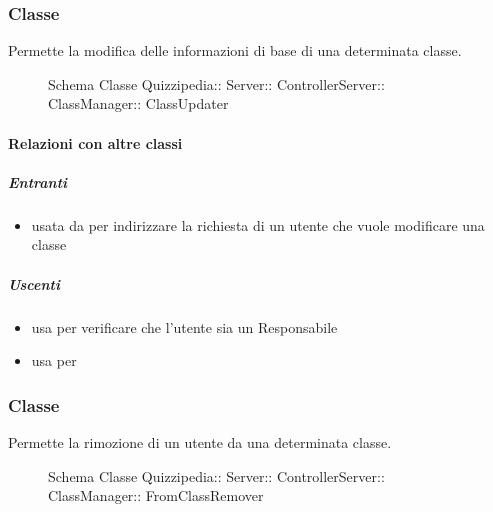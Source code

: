 \subsubsection{Classe }
Permette la modifica delle informazioni di base di una determinata classe.
\begin{figure}[H]
\centering
\noindent{}
\caption[Schema Classe ClassUpdater]{Schema Classe Quizzipedia:: Server:: ControllerServer:: ClassManager:: ClassUpdater}
\end{figure}
\paragraph{Relazioni con altre classi}
\subparagraph{Entranti}
\begin{itemize}
\item usata da  per indirizzare la richiesta di un utente che vuole modificare una classe
\end{itemize}
\subparagraph{Uscenti}
\begin{itemize}
\item usa  per verificare che l'utente sia un Responsabile
\item usa  per 
\end{itemize}
\subsubsection{Classe }
Permette la rimozione di un utente da una determinata classe.
\begin{figure}[H]
\centering
\noindent{}
\caption[Schema Classe FromClassRemover]{Schema Classe Quizzipedia:: Server:: ControllerServer:: ClassManager:: FromClassRemover}
\end{figure}
